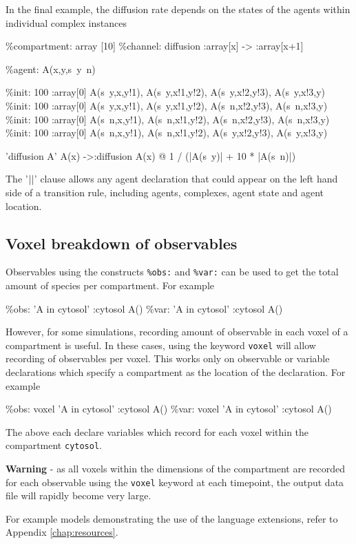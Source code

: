 In the final example, the diffusion rate depends on the states of the agents within individual complex instances

\begin{kappasource}
\%compartment: array [10]
\%channel: diffusion :array[x] -> :array[x+1]

\%agent: A(x,y,s~y~n)

\%init: 100 :array[0] A(s~y,x,y!1), A(s~y,x!1,y!2), A(s~y,x!2,y!3), A(s~y,x!3,y)
\%init: 100 :array[0] A(s~y,x,y!1), A(s~y,x!1,y!2), A(s~n,x!2,y!3), A(s~n,x!3,y)
\%init: 100 :array[0] A(s~n,x,y!1), A(s~n,x!1,y!2), A(s~n,x!2,y!3), A(s~n,x!3,y)
\%init: 100 :array[0] A(s~n,x,y!1), A(s~n,x!1,y!2), A(s~y,x!2,y!3), A(s~y,x!3,y)

'diffusion A' A(x) ->:diffusion A(x) @ 1 / (|A(s~y)| + 10 * |A(s~n)|)
\end{kappasource}

The '$\arrowvert\arrowvert$' clause allows any agent declaration that could appear on the left hand side of a transition rule, including agents, complexes, agent state and agent location.

\subsection{Voxel breakdown of observables}

Observables using the constructs \verb|%obs:| and \verb|%var:| can be used to get the total amount of species per compartment. For example

\begin{kappasource}
\%obs: 'A in cytosol' :cytosol A()
\%var: 'A in cytosol' :cytosol A()
\end{kappasource}

However, for some simulations, recording amount of observable in each voxel of a compartment is useful. In these cases, using the keyword \verb|voxel| will allow recording of observables per voxel. This works only on observable or variable declarations which specify a compartment as the location of the declaration. For example

\begin{kappasource}
\%obs: voxel 'A in cytosol' :cytosol A()
\%var: voxel 'A in cytosol' :cytosol A()
\end{kappasource}

The above each declare variables which record for each voxel within the compartment \verb|cytosol|.

\textbf{Warning} - as all voxels within the dimensions of the compartment are recorded for each observable using the \verb|voxel| keyword at each timepoint, the output data file will rapidly become very large.


\bigskip For example models demonstrating the use of the language extensions, refer to Appendix \ref{chap:resources}.

\newpage
